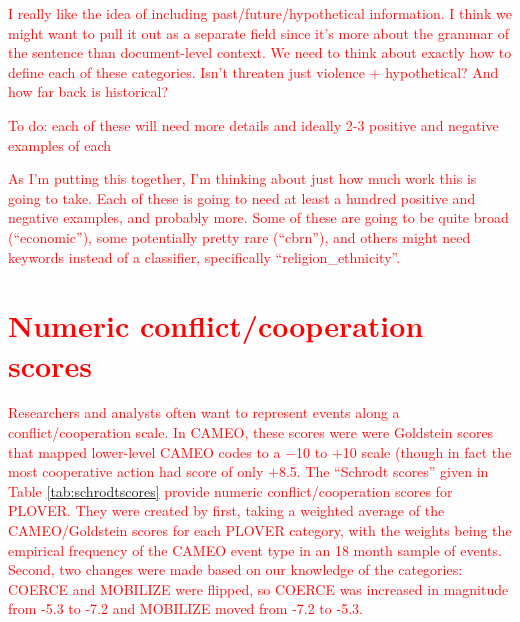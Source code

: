 \documentclass[11pt]{report}
\newcommand{\andy}[1]{\textcolor{red}{#1}}
\begin{document}
\andy{I really like the idea of including past/future/hypothetical information. I think we might want to pull it out as a separate field since it's more about the grammar of the sentence than document-level context. We need to think about exactly how to define each of these categories. Isn't threaten just violence + hypothetical? And how far back is historical?}

\andy{To do: each of these will need more details and ideally 2-3 positive and negative examples of each}

\andy{As I'm putting this together, I'm thinking about just how much work this is going to take. Each of these is going to need at least a hundred positive and negative examples, and probably more. Some of these are going to be quite broad (``economic''), some potentially pretty rare (``cbrn''), and others might need keywords instead of a classifier, specifically ``religion\_ethnicity''.}

\clearpage

\section{\andy{Numeric conflict/cooperation scores}}

\andy{Researchers and analysts often want to represent events along a conflict/cooperation scale. In CAMEO, these scores were were Goldstein scores that mapped lower-level CAMEO codes to a $-$10 to $+$10 scale (though in fact the most cooperative action had score of only $+$8.5. The ``Schrodt scores'' given in Table \ref{tab:schrodtscores} provide numeric conflict/cooperation scores for PLOVER. They were created by first, taking a weighted average of the CAMEO/Goldstein scores for each PLOVER category, with the weights being the empirical frequency of the CAMEO event type in an 18 month sample of events. Second, two changes were made based on our knowledge of the categories: COERCE and MOBILIZE were flipped, so COERCE was increased in magnitude from -5.3 to -7.2 and MOBILIZE moved from -7.2 to -5.3.}
\end{document}
